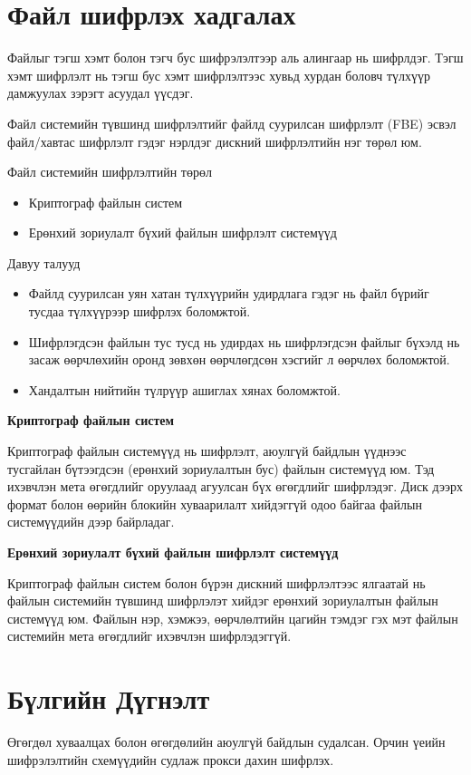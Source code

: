 \section{Файл шифрлэх хадгалах}

Файлыг тэгш хэмт болон тэгч бус шифрэлэлтээр аль алингаар нь шифрлдэг. Тэгш хэмт шифрлэлт нь тэгш бус хэмт шифрлэлтээс хувьд хурдан боловч түлхүүр дамжуулах зэрэгт асуудал үүсдэг.

Файл системийн түвшинд шифрлэлтийг файлд суурилсан шифрлэлт (FBE) эсвэл файл/хавтас шифрлэлт гэдэг нэрлдэг дискний шифрлэлтийн нэг төрөл юм.

Файл системийн шифрлэлтийн төрөл
\begin{itemize}
    \item Криптограф файлын систем
    \item Ерөнхий зориулалт бүхий файлын шифрлэлт системүүд
\end{itemize}

Давуу талууд
\begin{itemize}
    \item Файлд суурилсан уян хатан түлхүүрийн удирдлага гэдэг нь файл бүрийг тусдаа түлхүүрээр шифрлэх боломжтой.
    \item Шифрлэгдсэн файлын тус тусд нь удирдах нь шифрлэгдсэн файлыг бүхэлд нь засаж өөрчлөхийн оронд зөвхөн өөрчлөгдсөн хэсгийг л өөрчлөх боломжтой.
    \item Хандалтын нийтийн түлрүүр ашиглах хянах боломжтой.
\end{itemize}

\textbf{Криптограф файлын систем}

Криптограф файлын системүүд нь шифрлэлт, аюулгүй байдлын үүднээс тусгайлан бүтээгдсэн (ерөнхий зориулалтын бус) файлын системүүд юм. Тэд ихэвчлэн мета өгөгдлийг оруулаад агуулсан бүх өгөгдлийг шифрлэдэг. Диск дээрх формат болон өөрийн блокийн хуваарилалт хийдэггүй одоо байгаа файлын системүүдийн дээр байрладаг.

\textbf{Ерөнхий зориулалт бүхий файлын шифрлэлт системүүд}

Криптограф файлын систем болон бүрэн дискний шифрлэлтээс ялгаатай нь файлын системийн түвшинд шифрлэлэт хийдэг ерөнхий зориулалтын файлын системүүд юм. Файлын нэр, хэмжээ, өөрчлөлтийн цагийн тэмдэг гэх мэт файлын системийн мета өгөгдлийг ихэвчлэн шифрлэдэггүй.


\section{Бүлгийн Дүгнэлт}

Өгөгдөл хуваалцах болон өгөгдөлийн аюулгүй байдлын судалсан. Орчин үеийн шифрэлэлтийн схемүүдийн судлаж прокси дахин шифрлэх.
